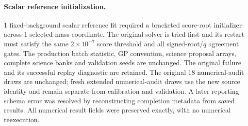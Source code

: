 \paragraph{Scalar reference initialization.} 1 fixed-background scalar reference fit required a bracketed score-root initializer across 1 selected mass coordinate. The original solver is tried first and its restart must satisfy the same $2\times10^{-7}$ score threshold and all signed-root/$q$ agreement gates. The production batch statistic, GP convention, science proposal arrays, complete science banks and validation seeds are unchanged. The original failure and its successful replay diagnostic are retained. The original 18 numerical-audit draws are unchanged; fresh extended numerical-audit draws use the new source identity and remain separate from calibration and validation. A later reporting-schema error was resolved by reconstructing completion metadata from saved results. All numerical result fields were preserved exactly, with no numerical reexecution.

